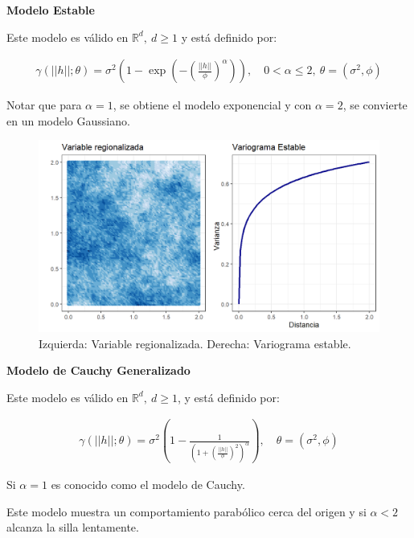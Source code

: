 \documentclass[
]{book}
\begin{document}
\textbf{Modelo Estable}

Este modelo es válido en \(\mathbb{R}^d,\ d\geq1\) y está definido por:

\begin{align*}
    \gamma(||h||;\theta)=\sigma^2 \left(1-\exp\left(-\left(\frac{||h||}{\phi}\right)^\alpha\right) \right),\quad 0<\alpha \leq 2,\ \theta=(\sigma^2,\phi)
\end{align*}

Notar que para \(\alpha=1\), se obtiene el modelo exponencial y con \(\alpha=2\), se convierte en un modelo Gaussiano.

\begin{figure}
\includegraphics[width=17.78in]{figuras/otros/estable_var} \caption{Izquierda: Variable regionalizada. Derecha: Variograma estable.}\label{fig:establevar}
\end{figure}

\textbf{Modelo de Cauchy Generalizado}

Este modelo es válido en \(\mathbb{R}^d,\ d\geq1\), y está definido por:

\begin{align*}
    \gamma(||h||;\theta)=\sigma^2\left(1-\frac{1}{\left(1+\left( \frac{||h||}{\phi} \right)^2\right)^\alpha} \right), \quad \theta=(\sigma^2,\phi)
\end{align*}

Si \(\alpha=1\) es conocido como el modelo de Cauchy.

Este modelo muestra un comportamiento parabólico cerca del origen y si \(\alpha<2\) alcanza la silla lentamente.
\end{document}
